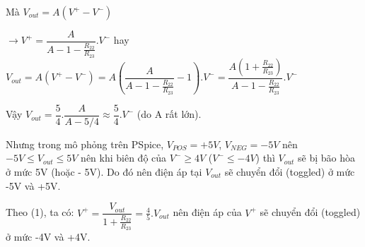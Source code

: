 Mà $V_{out} = A(V^+ - V^-)$

$\rightarrow V^+ = \dfrac{A}{A - 1 - \frac{R_{22}}{R_{23}}}.V^-$ hay $V_{out} = A(V^+ - V^-) = A(\dfrac{A}{A - 1 - \frac{R_{22}}{R_{23}}} - 1).V^- = \dfrac{A(1 + \frac{R_{22}}{R_{23}})}{A-1-\frac{R_{22}}{R_{23}}}.V^-$

Vậy $V_{out} = \dfrac{5}{4}.\dfrac{A}{A - 5/4} \approx \dfrac{5}{4}.V^-$ (do A rất lớn).

Nhưng trong mô phỏng trên PSpice, $V_{POS} = +5V$, $V_{NEG} = -5V$ nên $-5V \leq V_{out} \leq 5V$ nên khi biên độ của $V^- \geq 4V$ ($V^- \leq -4V$) thì $V_{out}$ sẽ bị bão hòa ở mức 5V (hoặc - 5V). Do đó nên điện áp tại $V_{out}$ sẽ chuyển đổi (toggled) ở mức -5V và +5V.

Theo (1), ta có: $V^+ = \dfrac{V_{out}}{1 + \frac{R_{22}}{R_{23}}} = \frac{4}{5}.V_{out}$ nên điện áp của $V^+$ sẽ chuyển đổi (toggled) ở mức -4V và +4V.


